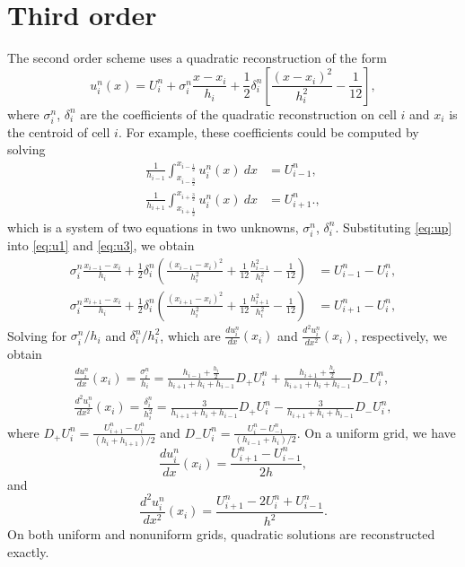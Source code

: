  \section{Third order}
The second order scheme uses a quadratic reconstruction of the form
	\begin{equation}
	u^n_i(x) = U^n_{i} + \sigma^n_{i}\frac{x-x_i}{h_i} + \frac{1}{2}\delta^n_{i} \left[\frac{(x-x_i)^2 }{h_i^2}- \frac{1}{12} \right],\label{eq:up}
	\end{equation}
	where $\sigma^n_{i}$, $\delta^n_{i}$ are the coefficients of the quadratic reconstruction on cell $i$ and $x_i$ is the centroid of cell $i$.  For example, these coefficients could be computed by solving
	\begin{align}
	 \frac{1}{h_{i-1}}\int^{x_{i-\frac{1}{2}}}_{x_{i-\frac{3}{2}}}u^n_i(x) ~dx &= U^n_{i-1}, \label{eq:u1}\\
	 \frac{1}{h_{i+1}}\int^{x_{i+\frac{3}{2}}}_{x_{i+\frac{1}{2}}}u^n_i(x) ~dx &= U^n_{i+1}. \label{eq:u3},
	\end{align}
	which is a system of two equations in two unknowns, $\sigma^n_{i}$, $\delta^n_{i}$.  Substituting \eqref{eq:up} into \eqref{eq:u1} and \eqref{eq:u3}, we obtain
	\begin{align}
	  \sigma^n_{i}\frac{x_{i-1}-x_i}{h_i} +  \frac{1}{2}\delta^n_{i}\left(\frac{(x_{i-1}-x_i)^2}{h_i^2}+\frac{1}{12}\frac{h_{i-1}^2}{h_i^2} - \frac{1}{12}\right)  &= U^n_{i-1}-U^n_i, \label{eq:uu1}\\
	 \sigma^n_{i}\frac{x_{i+1}-x_i}{h_i} +   \frac{1}{2}\delta^n_{i} \left(\frac{(x_{i+1}-x_i)^2}{h_i^2}+\frac{1}{12}\frac{h_{i+1}^2}{h_i^2} - \frac{1}{12}\right) &= U^n_{i+1}-U^n_i, \label{eq:uu3}
	\end{align}
	Solving for $\sigma^n_i/h_i$ and $\delta^n_i/h_i^2$, which are $\frac{du^n_i}{dx}(x_i)$ and $\frac{d^2u^n_i}{dx^2}(x_i)$, respectively, we obtain
	\begin{align}
	    \frac{du^n_i}{dx}(x_i) = \frac{\sigma^n_i}{h_i}= \frac{h_{i-1}+\frac{h_i}{2}}{h_{i+1}+h_i+h_{i-1}}D_{+}U^n_i+\frac{h_{i+1}+\frac{h_i}{2}}{h_{i+1}+h_i+h_{i-1}}D_{-}U^n_i,\\
	    \frac{d^2u^n_i}{dx^2}(x_i) = \frac{\delta^n_i}{h_i^2}=\frac{3}{h_{i+1}+h_i+h_{i-1}}D_{+}U^n_i -\frac{3}{h_{i+1}+h_i+h_{i-1}}D_{-}U^n_i,
	\end{align}
	where $D_{+}U^n_i = \frac{U^n_{i+1} - U^n_i}{(h_i + h_{i+1})/2}$ and $D_{-}U^n_i = \frac{U^n_{i} - U^n_{-1}}{(h_{i-1} + h_{i})/2}$.
	On a uniform grid, we have
	$$
	\frac{du^n_i}{dx}(x_i) = \frac{U^n_{i+1} - U^n_{i-1}}{2h},
	$$
	and
	$$
	\frac{d^2u^n_i}{dx^2}(x_i) = \frac{U^n_{i+1} - 2U^n_i + U^n_{i-1}}{h^2}.
	$$
	On both uniform and nonuniform grids, quadratic solutions are reconstructed exactly.